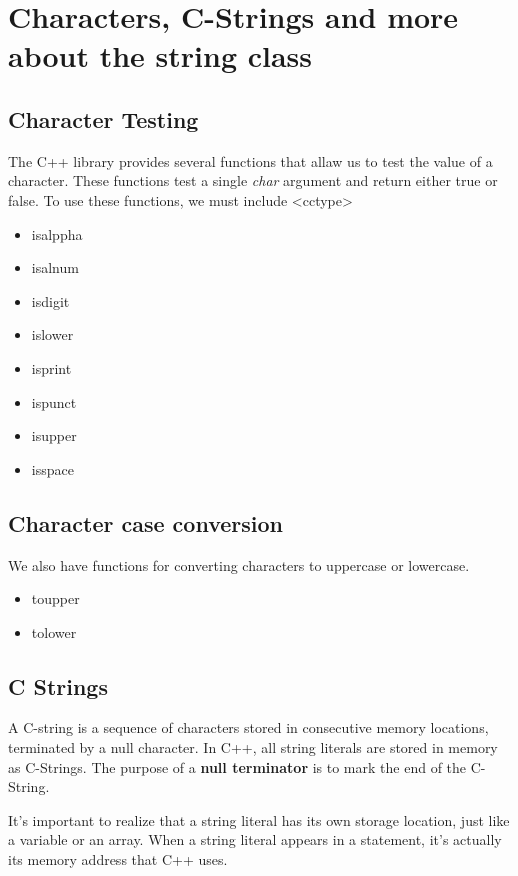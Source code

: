 \documentclass{report}
\begin{document}
    \pagebreak \bigbreak \noindent 
    \section{\LARGE Characters, C-Strings and more about the string class}
    \bigbreak \noindent 
    \subsection{Character Testing}
    \bigbreak \noindent 
    The C++ library provides several functions that allaw us to test the value of a character. These functions test a single \textit{char} argument and return either true or false.
    \bigbreak \noindent 
    To use these functions, we must include <cctype>
    \begin{itemize}
        \item isalppha
        \item isalnum
        \item isdigit
        \item islower
        \item isprint
        \item ispunct
        \item isupper
        \item isspace
    \end{itemize}

    \bigbreak \noindent 
    \subsection{Character case conversion}
    \bigbreak \noindent 
    We also have functions for converting characters to uppercase or lowercase.
    \begin{itemize}
        \item toupper
        \item tolower
    \end{itemize}

    \bigbreak \noindent 
    \subsection{C Strings }
    \bigbreak \noindent 
    \begin{concept}
 A C-string is a sequence of characters stored in consecutive memory locations, terminated by a null character. In C++, all string literals are stored in memory as C-Strings. The purpose of  a \textbf{null terminator} is to mark the end of the C-String.
	\end{concept}
    \bigbreak \noindent 
    It's important to realize that a string literal has its own storage location, just like a variable or an array. When a string literal appears in a statement, it's actually its memory address that C++ uses. 
\end{document}
